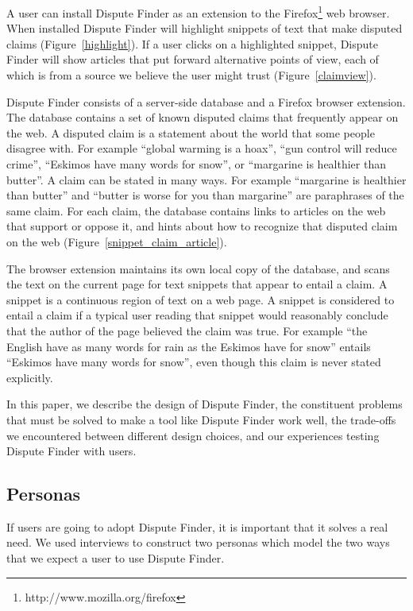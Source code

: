 \documentclass{www2010-accepted}
\newcommand{\todo}[1]{}
\begin{document}
A user can install Dispute Finder as an extension to the Firefox\footnote{http://www.mozilla.org/firefox} web browser. When installed Dispute Finder will highlight snippets of text that make disputed claims (Figure~\ref{highlight}). 
If a user clicks on a highlighted snippet, Dispute Finder will show articles that put forward alternative points of view,  each of which is from a source we believe the user might trust (Figure~\ref{claimview}). 

Dispute Finder consists of a server-side database and a Firefox browser extension. The database contains a set of known disputed claims that frequently appear on the web. A disputed claim is a statement about the world that some people disagree with. For example ``global warming is a hoax'', ``gun control will reduce crime'', ``Eskimos have many words for snow'', or ``margarine is healthier than butter''. A claim can be stated in many ways. For example ``margarine is healthier than butter'' and ``butter is worse for you than margarine'' are paraphrases of the same claim. For each claim, the database contains links to articles on the web that support or oppose it, and hints about how to recognize that disputed claim on the web (Figure~\ref{snippet_claim_article}).

The browser extension maintains its own local copy of the database, and scans the text on the current page for text snippets that appear to entail a claim. A snippet is a continuous region of text on a web page. A snippet is considered to entail a claim if a typical user reading that snippet would reasonably conclude that the author of the page believed the claim was true. For example ``the English have as many words for rain as the Eskimos have for snow'' entails ``Eskimos have many words for snow'', even though this claim is never stated explicitly.

\todo{Should we mention the API? Cut from this version as tangential}

In this paper, we describe the design of Dispute Finder, the constituent problems that must be solved to make a tool like Dispute Finder work well, the trade-offs we encountered between different design choices, and our experiences testing Dispute Finder with users.

\subsection{Personas}

If users are going to adopt Dispute Finder, it is important that it solves a real need. We used interviews to construct two personas which model the two ways that we expect a user to use Dispute Finder.
\end{document}
